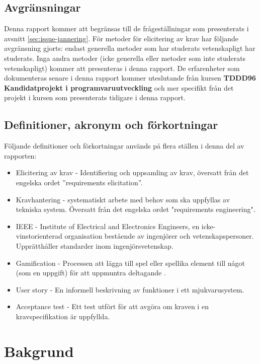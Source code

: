 \subsection{Avgränsningar}
\label{sec:limits-jannering}
Denna rapport kommer att begränsas till de frågeställningar som presenterats i avsnitt \ref{sec:issue-jannering}. För metoder för elicitering av krav har följande avgränsning gjorts: endast generella metoder som har studerats vetenskapligt har studerats. Inga andra metoder (icke generella eller metoder som inte studerats vetenskapligt) kommer att presenteras i denna rapport. De erfarenheter som dokumenteras senare i denna rapport kommer uteslutande från kursen \textbf{TDDD96 	Kandidatprojekt i programvaruutveckling} och mer specifikt från det projekt i kursen som presenterats tidigare i denna rapport.   
\subsection{Definitioner, akronym och förkortningar}
\label{sec:def-jannering}
Följande definitioner och förkortningar används på flera ställen i denna del av rapporten:
\begin{itemize}
	\item Elicitering av krav - Identifiering och uppsamling av krav, översatt från det engelska ordet ”requirements elicitation”.
	\item Kravhantering - systematiskt arbete med behov som ska uppfyllas av tekniska system. Översatt från det engelska ordet "requirements engineering".
	\item IEEE - Institute of Electrical and Electronics Engineers, en icke-vinstorienterad organisation bestående av ingenjörer och vetenskapspersoner. Upprätthåller standarder inom ingenjörsvetenskap.
	\item Gamification - Processen att lägga till spel eller spellika element till något (som en uppgift) för att uppmuntra deltagande \cite{lombriser2016gamified}.
	\item User story - En informell beskrivning av  funktioner i ett mjukvarusystem.
	\item Acceptance test - Ett test utfört för att avgöra om kraven i en kravspecifikation är uppfyllda.
\end{itemize}
\section{Bakgrund}
\label{sec:background-jannering}

